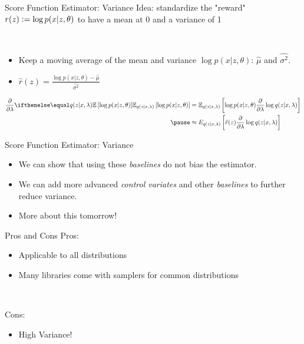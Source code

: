 \begin{frame}{Score Function Estimator: Variance}
Idea: standardize the "reward" $r(z) \vcentcolon= \log p(x|z, \theta)$ to have a mean at 0 and a variance of 1 \pause

~ 

\begin{itemize}
  \setlength\itemsep{0.7em}
    \item Keep a moving average of the mean and variance $\log p(x|z, \theta)$: $\hat{\mu}$ and $\hat{\sigma^2}$. \pause
    \item $\hat{r}(z) = \frac{\log p(x|z, \theta)-\hat{\mu}}{\hat{\sigma^2}}$
\end{itemize}

\pause

\begin{small}
\begin{equation*}
\begin{aligned}
\pdv{\lambda}\E[q(z|x,\lambda)]{\log p(x|z,\theta)}
&= \mathbb E_{q(z|x,\lambda)} \left[  \log p(x|z,\theta)  \pdv{\lambda}\log q(z|x,\lambda)\right]\\ \pause
&\approx E_{q(z|x,\lambda)} \left[  \hat{r}(z) \pdv{\lambda}\log q(z|x,\lambda)\right]
\end{aligned}
\end{equation*}
\end{small}

\end{frame}

\begin{frame}{Score Function Estimator: Variance}

\begin{itemize}
    \item We can show that using these \emph{baselines} do not bias the estimator. \pause
    \item We can add more advanced \emph{control variates} and other \emph{baselines} to further reduce variance. \pause
    \item More about this tomorrow!
\end{itemize}

\end{frame}

\begin{frame}{Pros and Cons}
Pros:
\begin{itemize}
\item Applicable to all distributions
\item Many libraries come with samplers for common distributions
\end{itemize}
\pause

~

Cons:
\begin{itemize}
\item High Variance!
\end{itemize}
\end{frame}



